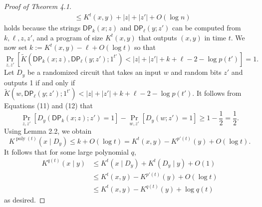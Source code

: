 \begin{proof}[Proof of Theorem 4.1]
\begin{align*}
&\leq K^t(x,y)+|z|+|z'|+O(\log n)
\end{align*}
holds because the strings $\mathsf{DP}_k(x;z)$ and $\mathsf{DP}_\ell(y;z')$ can be computed from $k,\ell,z,z'$, and a program of size $K^t(x,y)$ that outputs $(x,y)$ in time $t$. We now set $k:=K^t(x,y)-\ell+O(\log t)$ so that
\[\Pr_{z,z'}[\widetilde K(\mathsf{DP}_k(x;z),\mathsf{DP}_\ell(y;z');1^{t'})<|z|+|z'|+k+\ell-2-\log p(t')]=1.\tag{12}\]
Let $D_y$ be a randomized circuit that takes an input $w$ and random bits $z'$ and outputs 1 if and only if $\widetilde K(w,\mathsf{DP}_\ell(y;z');1^{t'})<|z|+|z'|+k+\ell-2-\log p(t')$. It follows from Equations (11) and (12) that
\[\Pr_{z,z'}[D_y(\mathsf{DP}_k(x;z);z')=1]-\Pr_{w,z'}[D_y(w;z')=1]\geq1-\frac12=\frac12.\]
Using Lemma 2.2, we obtain
\[K^{\operatorname{poly}(t)}(x\mid D_y)\leq k+O(\log t)=K^t(x,y)-K^{p'(t)}(y)+O(\log t).\]
It follows that for some large polynomial $q$,
\begin{align*}
K^{q(t)}(x\mid y)&\leq K^t(x\mid D_y)+K^t(D_y\mid y)+O(1)\\
&\leq K^t(x,y)-K^{p'(t)}(y)+O(\log t)\\
&\leq K^t(x,y)-K^{q(t)}(y)+\log q(t)
\end{align*}
as desired.
\end{proof}
